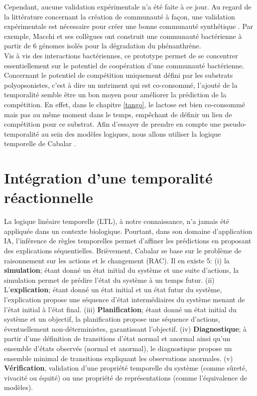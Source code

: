 \documentclass[../main.tex]{subfiles}
\begin{document}
Cependant, aucune validation expérimentale n'a été faite à ce jour. Au regard de la littérature concernant la création de communauté à façon, une validation expérimentale est nécessaire pour créer une bonne communauté synthétique \citep{Sharma2020,Vazquez-Castellanos2019}. Par exemple, Macchi et ses collègues \citep{Macchi2021} ont construit une communauté bactérienne à partir de 6 génomes isolés pour la dégradation du phénanthrène. \\

Vis à vis des interactions bactériennes, ce prototype permet de se concentrer essentiellement sur le potentiel de coopération d'une communauté bactérienne. Concernant le potentiel de compétition uniquement défini par les substrats polyopsonistes, c'est à dire un nutriment qui est co-consommé, l'ajouté de la temporalité semble être un bon moyen pour améliorer la prédiction de la compétition. En effet, dans le chapitre \ref{tango}, le lactose est bien co-consommé mais pas au même moment dans le temps, empêchant de définir un lien de compétition pour ce substrat. Afin d'essayer de prendre en compte une pseudo-temporalité au sein des modèles logiques, nous allons utiliser la logique temporelle de Cabalar \citep{Cabalar2019}.


\newpage

\section{Intégration d'une temporalité réactionnelle}
La logique linéaire temporelle (LTL), à notre connaissance, n'a jamais été appliquée dans un contexte biologique. Pourtant, dans son domaine d'application IA, l'inférence de règles temporelles permet d'affiner les prédictions en proposant des explications séquentielles. Brièvement, Cabalar se base sur le problème de raisonnement sur les actions et le changement (RAC). Il en existe 5: (i) la \textbf{simulation}; étant donné un état initial du système et une suite d'actions, la simulation permet de prédire l'état du système à un temps futur. (ii) L'\textbf{explication}; étant donné un état initial et un état futur du système, l'explication propose une séquence d'état intermédiaires du système menant de l'état initial à l'état final. (iii) \textbf{Planification}; étant donné un état initial du système et un objectif, la planification propose une séquence d'actions, éventuellement non-déterministes, garantissant l'objectif. (iv) \textbf{Diagnostique}; à partir d'une définition de transitions d'état normal et anormal ainsi qu'un ensemble d'états observés (normal et anormal),  le diagnostique propose un ensemble minimal de transitions expliquant les observations anormales. (v) \textbf{Vérification}, validation d'une propriété temporelle du système (comme sûreté, vivacité ou équité) ou une propriété de représentations (comme l'équivalence de modèles). \\
\end{document}
